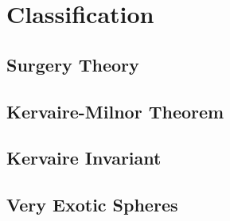 \chapter{Classification}\label{chap:classification}

\section{Surgery Theory}

\section{Kervaire-Milnor Theorem}

\section{Kervaire Invariant}

\section{Very Exotic Spheres}
